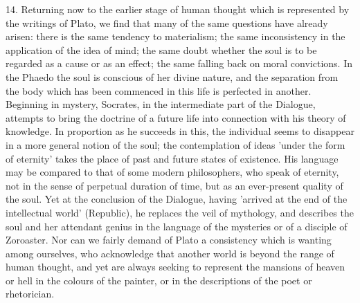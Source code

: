 \documentclass[11pt,letter]{article}
\begin{document}
\par  14. Returning now to the earlier stage of human thought which is represented by the writings of Plato, we find that many of the same questions have already arisen: there is the same tendency to materialism; the same inconsistency in the application of the idea of mind; the same doubt whether the soul is to be regarded as a cause or as an effect; the same falling back on moral convictions. In the Phaedo the soul is conscious of her divine nature, and the separation from the body which has been commenced in this life is perfected in another. Beginning in mystery, Socrates, in the intermediate part of the Dialogue, attempts to bring the doctrine of a future life into connection with his theory of knowledge. In proportion as he succeeds in this, the individual seems to disappear in a more general notion of the soul; the contemplation of ideas 'under the form of eternity' takes the place of past and future states of existence. His language may be compared to that of some modern philosophers, who speak of eternity, not in the sense of perpetual duration of time, but as an ever-present quality of the soul. Yet at the conclusion of the Dialogue, having 'arrived at the end of the intellectual world' (Republic), he replaces the veil of mythology, and describes the soul and her attendant genius in the language of the mysteries or of a disciple of Zoroaster. Nor can we fairly demand of Plato a consistency which is wanting among ourselves, who acknowledge that another world is beyond the range of human thought, and yet are always seeking to represent the mansions of heaven or hell in the colours of the painter, or in the descriptions of the poet or rhetorician.
\end{document}
